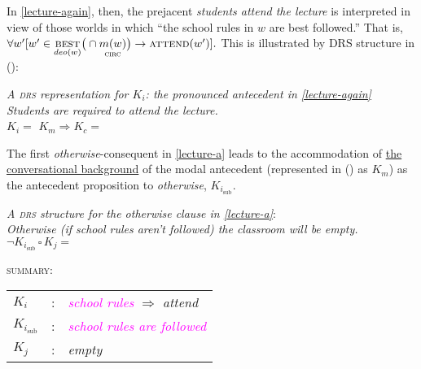 In \ref{lecture-again}, then, the prejacent \textit{students attend the lecture} is interpreted in view of those worlds in which ``the school rules in $w$ are best followed.'' That is, $ \forall w'[w'\in\underset{deo(w)}{\textsc{best}}\big(\cap\underset{\textsc{circ}}{m(w)}\big)\to\textsc{attend}(w')].$ This is illustrated by DRS structure in (\nextx):

\pex \label{antecedent-drs-lecture}\textit{A \textsc{drs} representation for $ K_i $: the pronounced antecedent in \ref{lecture-again}} \\
\emph{Students are required to attend the lecture.}\\
$K_i =$ \hspace*{0.5em}$ K_m\Rightarrow K_c = $ \hspace*{1.5em}\label{lecture-Ki}\xe

The first \textit{otherwise}-consequent in \ref{lecture-a} leads to the accommodation of \uline{the conversational background} of the modal antecedent (represented in (\lastx) as $ K_m $) as the antecedent proposition to \textit{otherwise}, $K_{i_{\text{sub}}}$.

\pex \label{lectureDRSa}\textit{A \textsc{drs} structure for the \textit{otherwise} clause in \ref{lecture-a}}:	\\
{\it Otherwise \color{violet}(if school rules aren't followed) \color{black} the classroom will be empty.}\\
\hspace*{-3em} $\neg K_{i_{\text{sub}}}\,\square\,K_j =$ 
\begin{minipage}{.2\textwidth}
	\hspace{0.5em}
	\textsc{summary:} \\[6pt]
	\begin{tabular}{lc l}
		$K_i$ &:&  \textit{\scriptsize\textcolor{magenta}{school rules}} $ \Rightarrow $ \textit{attend}\\
		$K_{i_{\text{sub}}}$ &:& \textit{\scriptsize\textcolor{magenta}{school rules are followed}}\\
		$K_j$ &:& \textit{empty}\\
	\end{tabular}
\end{minipage}\xe


